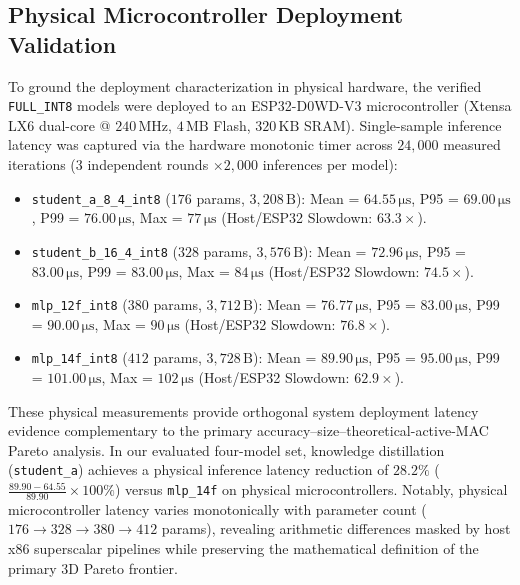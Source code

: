 \documentclass[journal,10pt]{IEEEtran}
\begin{document}
\subsection{Physical Microcontroller Deployment Validation}
To ground the deployment characterization in physical hardware, the verified \texttt{FULL\_INT8} models were deployed to an ESP32-D0WD-V3 microcontroller (Xtensa LX6 dual-core @ $240\,\text{MHz}$, $4\,\text{MB}$ Flash, $320\,\text{KB}$ SRAM). Single-sample inference latency was captured via the hardware monotonic timer  across $24,000$ measured iterations ($3$ independent rounds $\times 2,000$ inferences per model):
\begin{itemize}
    \item \texttt{student\_a\_8\_4\_int8} ($176$ params, $3,208\,\text{B}$): Mean = $64.55\,\si{\micro\second}$, P95 = $69.00\,\si{\micro\second}$, P99 = $76.00\,\si{\micro\second}$, Max = $77\,\si{\micro\second}$ (Host/ESP32 Slowdown: $63.3\times$).
    \item \texttt{student\_b\_16\_4\_int8} ($328$ params, $3,576\,\text{B}$): Mean = $72.96\,\si{\micro\second}$, P95 = $83.00\,\si{\micro\second}$, P99 = $83.00\,\si{\micro\second}$, Max = $84\,\si{\micro\second}$ (Host/ESP32 Slowdown: $74.5\times$).
    \item \texttt{mlp\_12f\_int8} ($380$ params, $3,712\,\text{B}$): Mean = $76.77\,\si{\micro\second}$, P95 = $83.00\,\si{\micro\second}$, P99 = $90.00\,\si{\micro\second}$, Max = $90\,\si{\micro\second}$ (Host/ESP32 Slowdown: $76.8\times$).
    \item \texttt{mlp\_14f\_int8} ($412$ params, $3,728\,\text{B}$): Mean = $89.90\,\si{\micro\second}$, P95 = $95.00\,\si{\micro\second}$, P99 = $101.00\,\si{\micro\second}$, Max = $102\,\si{\micro\second}$ (Host/ESP32 Slowdown: $62.9\times$).
\end{itemize}
These physical measurements provide orthogonal system deployment latency evidence complementary to the primary accuracy--size--theoretical-active-MAC Pareto analysis. In our evaluated four-model set, knowledge distillation (\texttt{student\_a}) achieves a physical inference latency reduction of $28.2\%$ ($\frac{89.90 - 64.55}{89.90} \times 100\%$) versus \texttt{mlp\_14f} on physical microcontrollers. Notably, physical microcontroller latency varies monotonically with parameter count ($176 \rightarrow 328 \rightarrow 380 \rightarrow 412$ params), revealing arithmetic differences masked by host x86 superscalar pipelines while preserving the mathematical definition of the primary 3D Pareto frontier.
\end{document}
